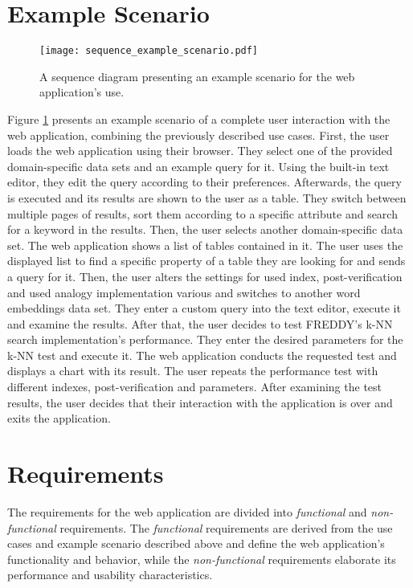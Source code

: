 \section{Example Scenario}
\label{sec:req_example_scenario}
\begin{figure}
	\centering\texttt{[image: sequence\_example\_scenario.pdf]}
	\caption{A sequence diagram presenting an example scenario for the web application's use.}
	\label{fig:example_scenario}
\end{figure}
Figure \ref{fig:example_scenario} presents an example scenario of a complete user interaction with the web application, combining the previously described use cases. First, the user loads the web application using their browser. They select one of the provided domain-specific data sets and an example query for it. Using the built-in text editor, they edit the query according to their preferences. Afterwards, the query is executed and its results are shown to the user as a table. They switch between multiple pages of results, sort them according to a specific attribute and search for a keyword in the results. Then, the user selects another domain-specific data set. The web application shows a list of tables contained in it. The user uses the displayed list to find a specific property of a table they are looking for and sends a query for it. Then, the user alters the settings for used index, post-verification and used analogy implementation various and switches to another word embeddings data set. They enter a custom query into the text editor, execute it and examine the results. After that, the user decides to test FREDDY's k-NN search implementation's performance. They enter the desired parameters for the k-NN test and execute it. The web application conducts the requested test and displays a chart with its result. The user repeats the performance test with different indexes, post-verification and parameters. After examining the test results, the user decides that their interaction with the application is over and exits the application.

\section{Requirements}
\label{sec:requirements}
The requirements for the web application are divided into \textit{functional} and \textit{non-functional} requirements. The \textit{functional} requirements are derived from the use cases and example scenario described above and define the web application's functionality and behavior, while the \textit{non-functional} requirements elaborate its performance and usability characteristics.

